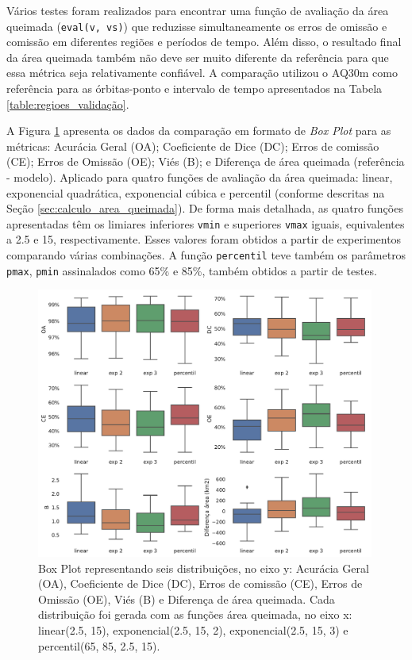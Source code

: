 \documentclass[cic,tc]{iiufrgs}
\begin{document}
Vários testes foram realizados para encontrar uma função de avaliação da área queimada (\texttt{eval(v, vs)}) que reduzisse simultaneamente os erros de omissão e comissão em diferentes regiões e períodos de tempo. Além disso, o resultado final da área queimada também não deve ser muito diferente da referência para que essa métrica seja relativamente confiável. A comparação utilizou o AQ30m como referência para as órbitas-ponto e intervalo de tempo apresentados na Tabela \ref{table:regioes_validação}. 

A Figura \ref{fig:comparacao_evals} apresenta os dados da comparação em formato de \textit{Box Plot} para as métricas: Acurácia Geral (OA); Coeficiente de Dice (DC); Erros de comissão (CE); Erros de Omissão (OE); Viés (B); e Diferença de área queimada (referência - modelo). Aplicado para quatro funções de avaliação da área queimada: linear, exponencial quadrática, exponencial cúbica e percentil (conforme descritas na Seção \ref{sec:calculo_area_queimada}). De forma mais detalhada, as quatro funções apresentadas têm os limiares inferiores \texttt{vmin} e superiores \texttt{vmax} iguais, equivalentes a 2.5 e 15, respectivamente. Esses valores foram obtidos a partir de experimentos comparando várias combinações. A função \texttt{percentil} teve também os parâmetros \texttt{pmax}, \texttt{pmin} assinalados como 65\% e 85\%, também obtidos a partir de testes. 

\begin{figure}[!htb]
    \caption{Box Plot representando seis distribuições, no eixo y: Acurácia Geral (OA), Coeficiente de Dice (DC), Erros de comissão (CE), Erros de Omissão (OE), Viés (B) e Diferença de área queimada. Cada distribuição foi gerada com as funções área queimada, no eixo x: linear(2.5, 15), exponencial(2.5, 15, 2), exponencial(2.5, 15, 3) e percentil(65, 85, 2.5, 15).}
    \begin{center}
        \includegraphics[width=30em]{comparacao_evals}
    \end{center}
    \label{fig:comparacao_evals}
\end{figure}
\end{document}
